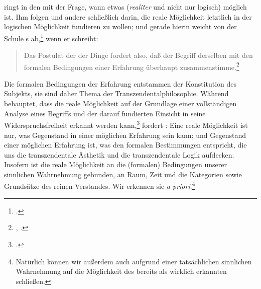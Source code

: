  ringt
in den  mit der
Frage, wann etwas (\emph{realiter} und nicht nur logisch) möglich ist. Ihm folgen
 und andere
schließlich darin, die reale Möglichkeit letztlich in der logischen Möglichkeit
fundieren zu wollen; und gerade hierin weicht  von der
Schule s
ab,\footnote{\cite[Vgl.][195]{Poser:DieStufenderModalitaet1981}.} wenn er
schreibt:
\begin{quote}
Das Postulat der  der Dinge fordert also, daß der Begriff
derselben mit den formalen Bedingungen einer Erfahrung überhaupt
zusammenstimme.\footnote{\cite[][B 267]{Kant:KritikderreinenVernunft2003},
\cite[][III: 186.25--27]{Kant:GesammelteWerke1900ff.}.}
\end{quote}
Die formalen Bedingungen der Erfahrung entstammen der Konstitution des Subjekts,
sie sind daher Thema der Transzendentalphilosophie. Während
 behauptet, dass die reale
Möglichkeit auf der Grundlage einer vollständigen Analyse eines Begriffs und der
darauf fundierten Einsicht in seine Widerspruchsfreiheit erkannt werden
kann,\footnote{\cite[Vgl.][589]{Leibniz:Meditationesdecognitioneveritateetideis1999}.}
fordert : Eine reale Möglichkeit ist nur, was Gegenstand in
einer möglichen Erfahrung sein kann; und Gegenstand einer möglichen Erfahrung
ist, was den formalen Bestimmungen entspricht, die uns die transzendentale
Ästhetik und die transzendentale Logik aufdecken. Insofern ist die reale
Möglichkeit an die (formalen) Bedingungen unserer sinnlichen Wahrnehmung
gebunden, an Raum, Zeit und die Kategorien sowie Grundsätze des reinen
Verstandes. Wir erkennen sie \emph{a priori}.\footnote{Natürlich
können wir außerdem auch aufgrund einer tatsächlichen sinnlichen Wahrnehmung auf
die Möglichkeit des bereits als wirklich erkannten schließen.}

